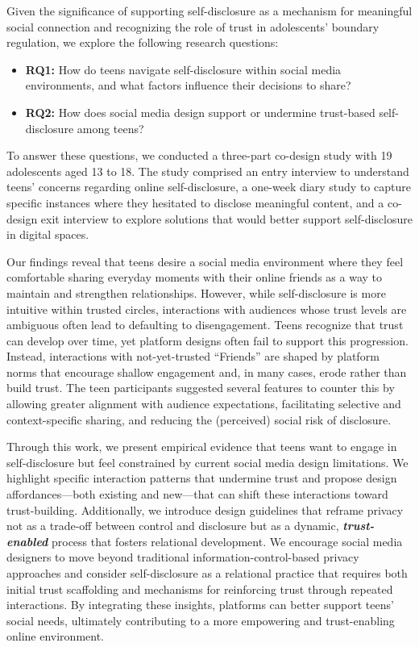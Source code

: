 Given the significance of supporting self-disclosure as a mechanism for meaningful social connection and recognizing the role of trust in adolescents' boundary regulation, we explore the following research questions:
\begin{itemize}
    \item \textbf{RQ1:} How do teens navigate self-disclosure within social media environments, and what factors influence their decisions to share?
    \item \textbf{RQ2:} How does social media design support or undermine trust-based self-disclosure among teens?
\end{itemize}
To answer these questions, we conducted a three-part co-design study with 19 adolescents aged 13 to 18. The study comprised an entry interview to understand teens' concerns regarding online self-disclosure, a one-week diary study to capture specific instances where they hesitated to disclose meaningful content, and a co-design exit interview to explore solutions that would better support self-disclosure in digital spaces. 

Our findings reveal that teens desire a social media environment where they feel comfortable sharing everyday moments with their online friends as a way to maintain and strengthen relationships. However, while self-disclosure is more intuitive within trusted circles, interactions with audiences whose trust levels are ambiguous often lead to defaulting to disengagement. Teens recognize that trust can develop over time, yet platform designs often fail to support this progression. Instead, interactions with not-yet-trusted ``Friends'' are shaped by platform norms that encourage shallow engagement and, in many cases, erode rather than build trust. The teen participants suggested several features to counter this by allowing greater alignment with audience expectations, facilitating selective and context-specific sharing, and reducing the (perceived) social risk of disclosure.

Through this work, we present empirical evidence that teens want to engage in self-disclosure but feel constrained by current social media design limitations. We highlight specific interaction patterns that undermine trust and propose design affordances---both existing and new---that can shift these interactions toward trust-building. Additionally, we introduce design guidelines that reframe privacy not as a trade-off between control and disclosure but as a dynamic, \textbf{\textit{trust-enabled}} process that fosters relational development. We encourage social media designers to move beyond traditional information-control-based privacy approaches and consider self-disclosure as a relational practice that requires both initial trust scaffolding and mechanisms for reinforcing trust through repeated interactions. By integrating these insights, platforms can better support teens' social needs, ultimately contributing to a more empowering and trust-enabling online environment.

